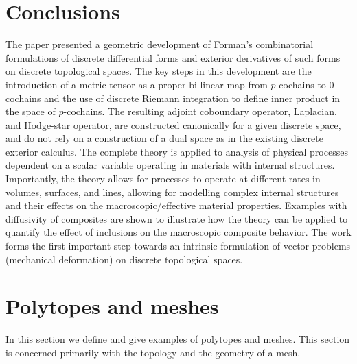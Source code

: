 \documentclass{elsarticle}
\theoremstyle{definition}
\begin{document}
\section{Conclusions}
\label{sec:conclusions}
The paper presented a geometric development of Forman's combinatorial formulations of discrete differential forms and exterior derivatives of such forms on discrete topological spaces. The key steps in this development are the introduction of a metric tensor as a proper bi-linear map from $p$-cochains to $0$-cochains and the use of discrete Riemann integration to define inner product in the space of $p$-cochains. The resulting adjoint coboundary operator, Laplacian, and Hodge-star operator, are constructed canonically for a given discrete space, and do not rely on a construction of a dual space as in the existing discrete exterior calculus. The complete theory is applied to analysis of physical processes dependent on a scalar variable operating in materials with internal structures. Importantly, the theory allows for processes to operate at different rates in volumes, surfaces, and lines, allowing for modelling complex internal structures and their effects on the macroscopic/effective material properties. Examples with diffusivity of composites are shown to illustrate how the theory can be applied to quantify the effect of inclusions on the macroscopic composite behavior. The work forms the first important step towards an intrinsic formulation of vector problems (mechanical deformation) on discrete topological spaces.

\appendix

\section{Polytopes and meshes}
\label{sec:polytope_mesh}
In this section we define and give examples of polytopes and meshes. This section is concerned primarily with the topology and the geometry of a mesh.
\end{document}
